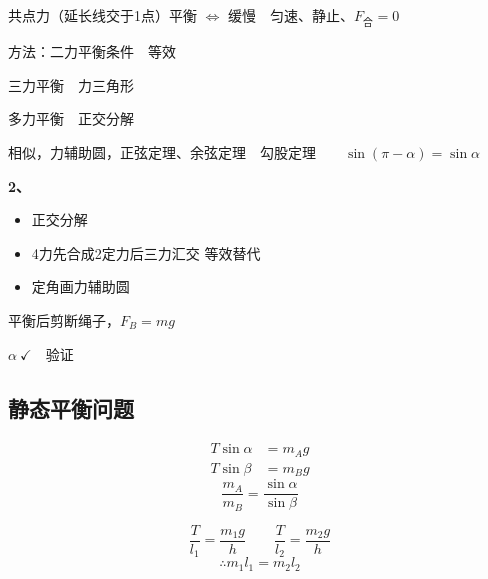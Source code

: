 共点力（延长线交于1点）平衡 $\Leftrightarrow$ 缓慢　匀速、静止、$F_{\text{合}}=0$ %

方法：二力平衡条件　等效

三力平衡　力三角形

多力平衡　正交分解

相似，力辅助圆，正弦定理、余弦定理　勾股定理　　$\sin(\pi-\alpha)=\sin\alpha$

\textbf{2、}
\begin{itemize}
\item 正交分解
\item 4力\quad 先合成2定力\quad 后三力汇交 \quad 等效替代
\item 定角\quad 画力\quad 辅助圆
\end{itemize}


平衡后剪断绳子，$F_B=mg$

$\alpha\ \checkmark$　验证

\subsection{静态平衡问题}
\begin{problem}
\begin{solution}
\begin{align*}
T\sin\alpha&=m_Ag\\
T\sin\beta&=m_Bg
\end{align*}
\[ \frac{m_A}{m_B}=\frac{\sin\alpha}{\sin\beta} \]
\end{solution}
\end{problem}

\begin{problem}[5]
\begin{solution}
\[ \frac{T}{l_1}=\frac{m_1g}{h}\qquad\frac{T}{l_2}=\frac{m_2g}{h} \]
\[ \therefore m_1l_1=m_2l_2 \]
\end{solution}
\end{problem}

